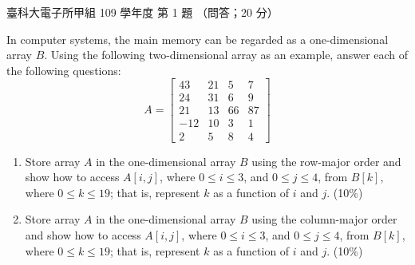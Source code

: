 \begin{pastexam}[label={px:ntust-109-et-ds-01}]{臺科大電子所甲組 109 學年度 第 1 題}
（問答；20 分）

In computer systems, the main memory can be regarded as a one-dimensional array $B$. Using the
following two-dimensional array as an example, answer each of the following questions:
\[ A=\begin{bmatrix} 43 & 21 & 5 & 7\\ 24 & 31 & 6 & 9\\ 21 & 13 & 66 & 87\\ -12 & 10 & 3 & 1\\ 2 & 5 & 8 & 4 \end{bmatrix} \]
\begin{enumerate}[label=(\alph*)]
\item Store array $A$ in the one-dimensional array $B$ using the row-major order and show how to
access $A[i,j]$, where $0\le i\le 3$, and $0\le j\le 4$, from $B[k]$, where $0\le k\le 19$; that is,
represent $k$ as a function of $i$ and $j$. (10\%)
\item Store array $A$ in the one-dimensional array $B$ using the column-major order and show how to
access $A[i,j]$, where $0\le i\le 3$, and $0\le j\le 4$, from $B[k]$, where $0\le k\le 19$; that is,
represent $k$ as a function of $i$ and $j$. (10\%)
\end{enumerate}
\end{pastexam}

